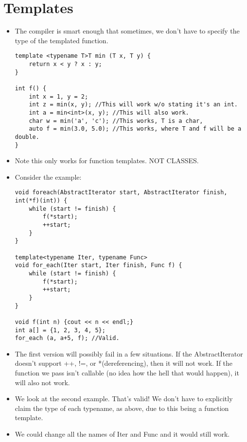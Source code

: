 \documentclass{article}
\author{Clement Tsang}
\begin{document}
\section{Templates}
\begin{itemize}
\item The compiler is smart enough that sometimes, we don't have to specify the type of the templated function.
\begin{lstlisting}
template <typename T>T min (T x, T y) {
    return x < y ? x : y;
}

int f() {
    int x = 1, y = 2;
    int z = min(x, y); //This will work w/o stating it's an int.
    int a = min<int>(x, y); //This will also work.
    char w = min('a', 'c'); //This works, T is a char,
    auto f = min(3.0, 5.0); //This works, where T and f will be a double. 
}
\end{lstlisting}
\item Note this only works for function templates.  NOT CLASSES.

\item Consider the example:
\begin{lstlisting}
void foreach(AbstractIterator start, AbstractIterator finish, int(*f)(int)) {
    while (start != finish) {
        f(*start);
        ++start;
    }
}

template<typename Iter, typename Func>
void for_each(Iter start, Iter finish, Func f) {
    while (start != finish) {
        f(*start);
        ++start;
    }
}

void f(int n) {cout << n << endl;}
int a[] = {1, 2, 3, 4, 5};
for_each (a, a+5, f); //Valid.
\end{lstlisting}
\item The first version will possibly fail in a few situations.  If the AbstractIterator doesn't support ++, !=, or *(dereferencing), then it will not work.  If the function we pass isn't callable (no idea how the hell that would happen), it will also not work.
\item We look at the second example.  That's valid!  We don't have to explicitly claim the type of each typename, as above, due to this being a function template.
\item We could change all the names of Iter and Func and it would still work.
\end{itemize}
\end{document}
